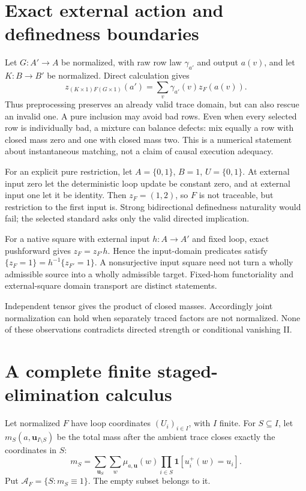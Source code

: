 \documentclass[11pt]{article}
\begin{document}
\section{Exact external action and definedness boundaries}
Let $G:A'\to A$ be normalized, with raw row law $\gamma_{a'}$ and output $a(v)$, and let $K:B\to B'$ be normalized. Direct calculation gives
\[
 z_{(K\times1)F(G\times1)}(a')
 =\sum_v\gamma_{a'}(v)z_F(a(v)). \tag{N}
\]
Thus preprocessing preserves an already valid trace domain, but can also rescue an invalid one. A pure inclusion may avoid bad rows. Even when every selected row is individually bad, a mixture can balance defects: mix equally a row with closed mass zero and one with closed mass two. This is a numerical statement about instantaneous matching, not a claim of causal execution adequacy.

For an explicit pure restriction, let $A=\{0,1\}$, $B=1$, $U=\{0,1\}$. At external input zero let the deterministic loop update be constant zero, and at external input one let it be identity. Then $z_F=(1,2)$, so $F$ is not traceable, but restriction to the first input is. Strong bidirectional definedness naturality would fail; the selected standard asks only the valid directed implication.

For a native square with external input $h:A\to A'$ and fixed loop, exact pushforward gives $z_F=z_{F'}h$. Hence the input-domain predicates satisfy $\{z_F=1\}=h^{-1}\{z_{F'}=1\}$. A nonsurjective input square need not turn a wholly admissible source into a wholly admissible target. Fixed-hom functoriality and external-square domain transport are distinct statements.

Independent tensor gives the product of closed masses. Accordingly joint normalization can hold when separately traced factors are not normalized. None of these observations contradicts directed strength or conditional vanishing II.

\section{A complete finite staged-elimination calculus}
Let normalized $F$ have loop coordinates $(U_i)_{i\in I}$, with $I$ finite. For $S\subseteq I$, let $m_S(a,\mathbf u_{I\setminus S})$ be the total mass after the ambient trace closes exactly the coordinates in $S$:
\[
 m_S=\sum_{\mathbf u_S}\sum_w\mu_{a,\mathbf u}(w)
       \prod_{i\in S}\mathbf1[u_i^+(w)=u_i]. \tag{M}
\]
Put $\mathcal A_F=\{S:m_S\equiv1\}$. The empty subset belongs to it.
\end{document}

